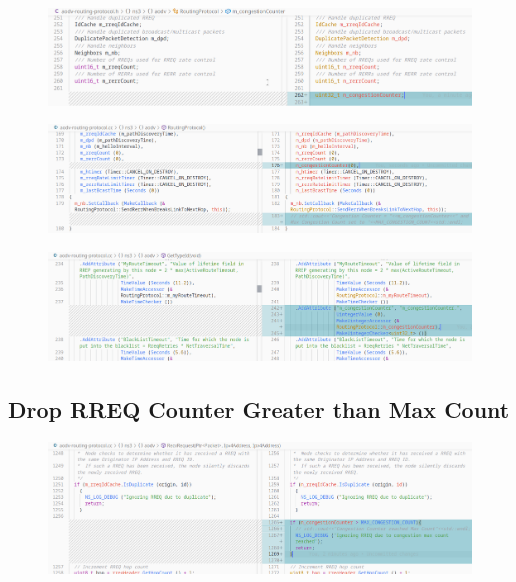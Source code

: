 \documentclass[12pt, a4paper]{article}
\begin{document}
\begin{figure}[H]
\centering
\includegraphics[scale = 0.4]{images/cc-aodv/aodv-05.png}

\end{figure}
\begin{figure}[H]
\centering
\includegraphics[scale = 0.4]{images/cc-aodv/aodv-06.png}

\end{figure}
\begin{figure}[H]
\centering
\includegraphics[scale = 0.4]{images/cc-aodv/aodv-07.png}

\end{figure}
\subsection{Drop RREQ Counter Greater than Max Count}
\begin{figure}[H]
\centering
\includegraphics[scale = 0.4]{images/cc-aodv/aodv-08.png}

\end{figure}
\end{document}
